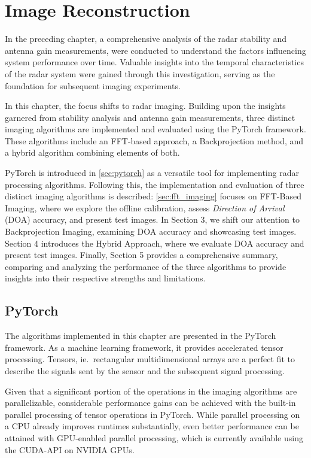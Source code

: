 \chapter{Image Reconstruction}
\label{ch:imaging}
In the preceding chapter, a comprehensive analysis of the radar stability and antenna gain measurements,
were conducted to understand the factors influencing system performance over time.
Valuable insights into the temporal characteristics of the radar system were gained through this investigation,
serving as the foundation for subsequent imaging experiments.

In this chapter, the focus shifts to radar imaging.
Building upon the insights garnered from stability analysis and antenna gain measurements,
three distinct imaging algorithms are implemented and evaluated using the PyTorch framework.
These algorithms include an FFT-based approach, a Backprojection method, and a hybrid algorithm combining elements of both.

PyTorch is introduced in \autoref{sec:pytorch} as a versatile tool for implementing radar processing algorithms.
Following this, the implementation and evaluation of three distinct imaging algorithms is described: 
\autoref{sec:fft_imaging} focuses on FFT-Based Imaging, where we explore the offline calibration,
assess \emph{Direction of Arrival} (DOA) accuracy,
and present test images. In Section 3, we shift our attention to Backprojection Imaging,
examining DOA accuracy and showcasing test images. Section 4 introduces the Hybrid Approach, 
where we evaluate DOA accuracy and present test images. 
Finally, Section 5 provides a comprehensive summary, 
comparing and analyzing the performance of the three algorithms to provide insights into their respective strengths and limitations.

\section{PyTorch}
\label{sec:pytorch}
The algorithms implemented in this chapter are presented in the PyTorch framework.
As a machine learning framework, it provides accelerated tensor processing.
Tensors, ie.\ rectangular multidimensional arrays are a perfect fit to
describe the signals sent by the sensor and the subsequent signal processing.

Given that a significant portion of the operations in the imaging algorithms are parallelizable,
considerable performance gains can be achieved with the built-in parallel processing of tensor operations in PyTorch. 
While parallel processing on a CPU already improves runtimes substantially, 
even better performance can be attained with GPU-enabled parallel processing, 
which is currently available using the CUDA-API on NVIDIA GPUs.


